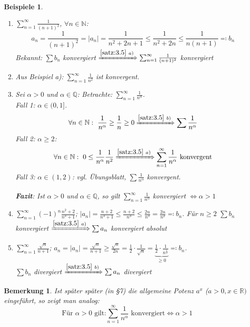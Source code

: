 \documentclass[titlepage,ngerman,a4paper,headsepline,DIV15,halfparskip*,14pt]{scrartcl}
\newcommand{\R}{\mathbb{R}}
\newcommand{\N}{\mathbb{N}}
\newcommand{\Q}{\mathbb{Q}}
\theoremstyle{dotless}
\newtheorem*{beispiele}{Beispiele}
\newtheorem*{bemerkung}{Bemerkung}
\begin{document}
\begin{beispiele} ~\
	\begin{enumerate}
		\item $\sum_{n=1}^{\infty} \frac{1}{(n+1)^{2}}$, $\forall n \in \N$:
			$$ a_{n} = \frac{1}{(n+1)^{2}} = |a_{n}| = \frac{1}{n^{2} + 2n +1} \leq \frac{1}{n^{2} + 2n} \leq \frac{1}{n(n+1)} \eqqcolon b_{n} $$
			Bekannt: $\sum b_{n}$ konvergiert $\xRightarrow[]{\ref{satz:3.5}~a)} \sum_{n=1}^{\infty} \frac{1}{(n+1)^{2}}$ konvergiert
		\item Aus Beispiel a): $\sum_{n=1}^{\infty} \frac{1}{n^{2}}$ ist konvergent.
		\item Sei $\alpha > 0$ und $\alpha \in \Q$: Betrachte: $\sum_{n=1}^{\infty} \frac{1}{n^{\alpha}}$. \\
			Fall 1: $\alpha \in (0, 1]$.
				$$ \forall n \in \N: ~ \frac{1}{n^{\alpha}} \geq \frac{1}{n} \geq 0 \xRightarrow[]{\ref{satz:3.5}~b)} \sum \frac{1}{n^{\alpha}} $$
			Fall 2: $\alpha \geq 2$: \\
				$$ \forall n \in \N: ~ 0 \leq \frac{1}{n^{\alpha}} \frac{1}{n^{2}} \xRightarrow[]{\ref{satz:3.5}~a)} \sum_{n=1}^{\infty} \frac{1}{n^{\alpha}} \text{ konvergent} $$
			Fall 3: $\alpha \in (1, 2)$: vgl. Übungsblatt, $\sum \frac{1}{n^{\alpha}}$ konvergent. \\ \\
			\textbf{Fazit}: Ist $\alpha > 0$ und $\alpha \in \Q$, so gilt $\sum_{n=1}^{\infty} \frac{1}{n^{\alpha}}$ konvergiert $\Leftrightarrow \alpha > 1$
		\item $\sum_{n=1}^{\infty} (-1)^{n} \frac{n^{2} + 2}{n^{3} + 1}$; $|a_{n}| = \frac{n+2}{n^{3} + 1} \leq \frac{n+2}{n^{3}} \leq \frac{2n}{n^{3}} = \frac{2n}{n^{2}} \eqqcolon b_{n}$. Für $n \geq 2$ $\sum b_{n}$ konvergiert $\xRightarrow[]{\ref{satz:3.5}~a)} \sum a_{n}$ konvergiert absolut
		\item $\sum_{n=1}^{\infty} \frac{\sqrt{n}}{n+1}$; $a_{n} = |a_{n}| = \frac{\sqrt{n}}{n+1} \geq \frac{\sqrt{n}}{2n} = \frac{1}{2} \cdot \frac{1}{\sqrt{n}} = \underbrace{\frac{1}{2} \cdot \frac{1}{n^{\frac{1}{2}}}}_{\geq 0} \eqqcolon b_{n}$. \\
			$\sum b_{n}$ divergiert $\xRightarrow[]{\ref{satz:3.5}~b)} \sum a_{n}$ divergiert
	\end{enumerate}		
\end{beispiele}


\begin{bemerkung}
	Ist später später (in \S 7) die allgemeine Potenz $a^{x}$ ($a > 0, x \in \R)$ eingeführt, so zeigt man analog:
	$$ \text{Für } \alpha > 0 \text{ gilt:} \sum_{n=1}^{\infty} \frac{1}{n^{\alpha}} \text{ konvergiert} \iff \alpha > 1 $$
\end{bemerkung}
\end{document}
